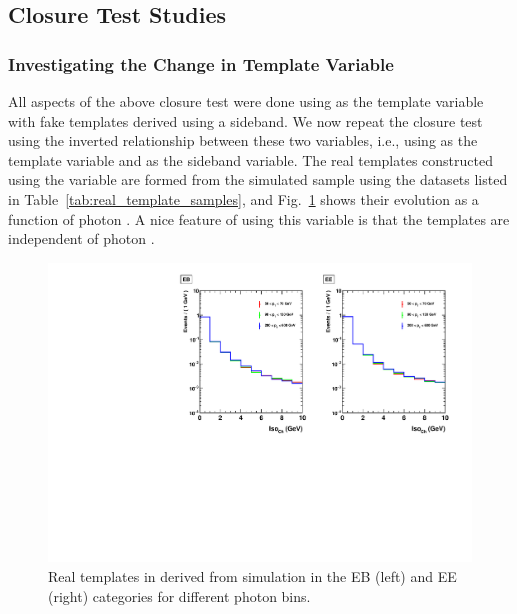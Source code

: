 \subsection{Closure Test Studies}\label{ssec:closure_test_studies}


\subsubsection{Investigating the Change in Template Variable}

All aspects of the above closure test were done using \sieie as the template variable with fake templates derived using a \chiso sideband. We now repeat the closure test using the inverted relationship between these two variables, i.e., using \chiso as the template variable and \sieie as the sideband variable. The real templates constructed using the \chiso variable are formed from the simulated sample using the datasets listed in Table~\ref{tab:real_template_samples}, and Fig.~\ref{fig:real_templates_chiso} shows their evolution as a function of photon \pt. A nice feature of using this variable is that the templates are independent of photon \pt.

\begin{figure}[!htbp]
  \centering
  \includegraphics[scale=0.66]{figures/real_templates_chIso_overlaid_sample_all.pdf}
  \caption{Real templates in \chiso derived from simulation in the EB (left) and EE (right) categories for different photon \pt bins.}
  \label{fig:real_templates_chiso}
\end{figure}

